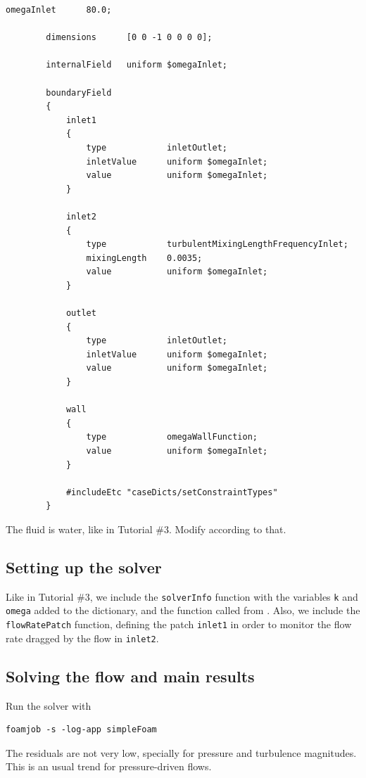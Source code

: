 \documentclass[
parskip=half,      %
DIV=12,            %
headings=normal,   %
fontsize=11pt,     %
english            %
]{scrartcl}
\begin{document}
	\begin{lstlisting}[style=output, caption={0/omega}]
		omegaInlet      80.0;
		
		dimensions      [0 0 -1 0 0 0 0];
		
		internalField   uniform $omegaInlet;
		
		boundaryField
		{
			inlet1
			{
				type            inletOutlet;
				inletValue      uniform $omegaInlet;
				value           uniform $omegaInlet;
			}
			
			inlet2
			{
				type            turbulentMixingLengthFrequencyInlet;
				mixingLength    0.0035;
				value           uniform $omegaInlet;
			}
			
			outlet
			{
				type            inletOutlet;
				inletValue      uniform $omegaInlet;
				value           uniform $omegaInlet;
			}
			
			wall
			{
				type            omegaWallFunction;
				value           uniform $omegaInlet;
			}
			
			#includeEtc "caseDicts/setConstraintTypes"
		}
	\end{lstlisting}
	
	The fluid is water, like in Tutorial \#3. Modify  according to that.
	
	\subsection{Setting up the solver}
	
	Like in Tutorial \#3, we include the \texttt{solverInfo} function with the variables 
	\texttt{k} and \texttt{omega} added to the dictionary, and the function called from 
	. Also, we include the \texttt{flowRatePatch} function,
	defining the patch \texttt{inlet1} in order to monitor the flow rate dragged
	by the flow in \texttt{inlet2}.
	
	\subsection{Solving the flow and main results}
	
	Run the solver with
	
	 \begin{lstlisting}[style=terminal]
		foamjob -s -log-app simpleFoam
	\end{lstlisting}
	
	The residuals are not very low, specially for pressure and turbulence magnitudes.
	 This is an usual trend for 
	pressure-driven flows.
	
\end{document}
